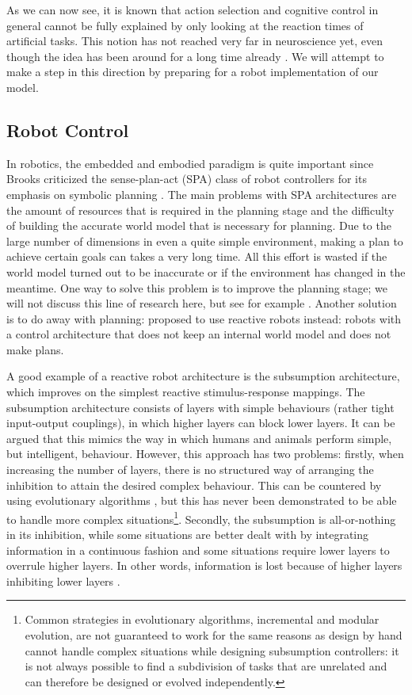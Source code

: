 \documentclass[10pt,a4paper]{report}
\begin{document}
As we can now see, it is known that action selection and cognitive control in general cannot be fully explained by only looking at the reaction times of artificial tasks. This notion has not reached very far in neuroscience yet, even though the idea has been around for a long time already \citep{Chiel1997}. We will attempt to make a step in this direction by preparing for a robot implementation of our model.

\subsection*{Robot Control}
In robotics, the embedded and embodied paradigm is quite important since Brooks criticized the sense-plan-act (SPA) class of robot controllers for its emphasis on symbolic planning \citep{Brooks1991a}. The main problems with SPA architectures are the amount of resources that is required in the planning stage and the difficulty of building the accurate world model that is necessary for planning. Due to the large number of dimensions in even a quite simple environment, making a plan to achieve certain goals can takes a very long time. All this effort is wasted if the world model turned out to be inaccurate or if the environment has changed in the meantime. One way to solve this problem is to improve the planning stage; we will not discuss this line of research here, but see for example \citet{Schut2001}. Another solution is to do away with planning: \citet{Brooks1991a} proposed to use reactive robots instead: robots with a control architecture that does not keep an internal world model and does not make plans.

A good example of a reactive robot architecture is the subsumption architecture, which improves on the simplest reactive stimulus-response mappings. The subsumption architecture consists of layers with simple behaviours (rather tight input-output couplings), in which higher layers can block lower layers. It can be argued that this mimics the way in which humans and animals perform simple, but intelligent, behaviour. However, this approach has two problems: firstly, when increasing the number of layers, there is no structured way of arranging the inhibition to attain the desired complex behaviour. This can be countered by using evolutionary algorithms \citep{Koza1994}, but this has never been demonstrated to be able to handle more complex situations\footnote{Common strategies in evolutionary algorithms, incremental and modular evolution, are not guaranteed to work for the same reasons as design by hand cannot handle complex situations while designing subsumption controllers: it is not always possible to find a subdivision of tasks that are unrelated and can therefore be designed or evolved independently.}. Secondly, the subsumption is all-or-nothing in its inhibition, while some situations are better dealt with by integrating information in a continuous fashion and some situations require lower layers to overrule higher layers. In other words, information is lost because of higher layers inhibiting lower layers \citep{Rosenblatt1989}.
\end{document}
